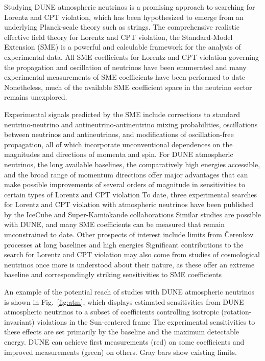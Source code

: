 Studying DUNE atmospheric neutrinos is a promising approach
to searching for Lorentz and CPT violation,
which has been hypothesized
to emerge from an underlying Planck-scale theory such as strings.
The comprehensive realistic effective field theory
for Lorentz and CPT violation,
the Standard-Model Extension (SME)
is a powerful and calculable framework
for the analysis of experimental data.
All SME coefficients for Lorentz and CPT violation
governing the propagation and oscillation of neutrinos
have been enumerated 
and many experimental measurements of SME coefficients 
have been performed to date
Nonetheless,
much of the available SME coefficient space 
in the neutrino sector remains unexplored.

Experimental signals predicted by the SME include
corrections to standard neutrino-neutrino 
and antineutrino-antineutrino mixing probabilities,
oscillations between neutrinos and antineutrinos,
and modifications of oscillation-free propagation,
all of which incorporate unconventional dependences
on the magnitudes and directions of momenta and spin.
For DUNE atmospheric neutrinos,
the long available baselines,
the comparatively high energies accessible,
and the broad range of momentum directions
offer major advantages that can make possible 
improvements of several orders of magnitude
in sensitivities to certain types of Lorentz and CPT violation
To date,
three experimental searches for Lorentz and CPT violation
with atmospheric neutrinos have been published 
by the IceCube and Super-Kamiokande collaborations
Similar studies are possible with DUNE,
and many SME coefficients can be measured that remain unconstrained to date.
Other prospects of interest include limits from \v Cerenkov processes
at long baselines and high energies
Significant contributions to the search 
for Lorentz and CPT violation may also 
come from studies of cosmological neutrinos
once more is understood about their nature,
as these offer an extreme baseline
and correspondingly striking sensitivities
to SME coefficients

An example of the potential reach of studies with DUNE atmospheric neutrinos
is shown in Fig.\ \ref{fig:atm},
which displays estimated sensitivities
from DUNE atmospheric neutrinos to a subset of coefficients 
controlling isotropic (rotation-invariant) violations 
in the Sun-centered frame
The experimental sensitivities to these effects
are set primarily by the baseline and the maximum detectable energy.
DUNE can achieve first measurements (red) on some coefficients
and improved measurements (green) on others.
Gray bars show existing limits.

